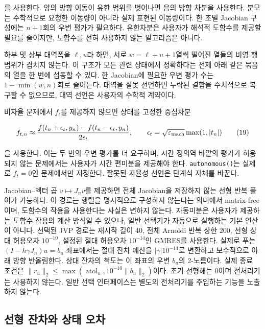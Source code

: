\documentclass[
  10pt,
  dvipsnames]{article}
\begin{document}
를 사용한다. 양의 방향 이동이 유한 범위를 벗어나면 음의 방향 차분을
사용한다. 분모는 수학적으로 요청한 이동량이 아니라 실제 표현된
이동량이다. 한 조밀 Jacobian 구성에는 \(n+1\)회의 우변 평가가 필요하다.
유한차분은 사용자가 해석적 도함수를 제공할 필요를 줄이지만, 도함수를
전혀 사용하지 않는 알고리즘은 아니다.

하부 및 상부 대역폭을 \(\ell,u\)라 하면, 서로 \(w=\ell+u+1\)열씩 떨어진
열들의 비영 행 범위가 겹치지 않는다. 이 구조가 모든 관련 상태에서
정확하다는 전제 아래 같은 묶음의 열을 한 번에 섭동할 수 있다. 한
Jacobian에 필요한 우변 평가 수는 \(1+\min(w,n)\)회로 줄어든다. 대역을
잘못 선언하면 누락된 결합을 수치적으로 복구할 수 없으므로, 대역 선언은
사용자의 수학적 계약이다.

비자율 문제에서 \(f_t\)를 제공하지 않으면 상태를 고정한 중심차분

\[
 f_{t,n}\approx\frac{f(t_n+\epsilon_t,y_n)-f(t_n-\epsilon_t,y_n)}{2\epsilon_t},
 \qquad \epsilon_t=\sqrt{\varepsilon_{\rm mach}}\max(1,|t_n|)
 \tag{19}
\]

을 사용한다. 이는 두 번의 우변 평가를 더 요구하며, 시간 정의역 바깥의
평가가 허용되지 않는 문제에서는 사용자가 시간 편미분을 제공해야 한다.
\texttt{autonomous()}는 실제로 \(f_t=0\)인 문제에서만 지정한다. 잘못된
자율성 선언은 단계식 자체를 바꾼다.

Jacobian--벡터 곱 \(v\mapsto J_nv\)를 제공하면 전체 Jacobian을 저장하지
않는 선형 반복 풀이가 가능하다. 이 경로는 행렬을 명시적으로 구성하지
않는다는 의미에서 matrix-free이며, 도함수의 작용을 사용한다는 사실은
변하지 않는다. 자동미분은 사용자가 제공하는 도함수 작용의 계산 방식일 수
있으나, 일반 선택기가 자동으로 실행하는 기본 연산이 아니다. 선택된 JVP
경로는 재시작 길이 40, 전체 Arnoldi 반복 상한 200, 선형 상대 허용오차
\(10^{-10}\), 설정된 절대 허용오차 \(10^{-14}\)인 GMRES를 사용한다.
실제로 푸는 \((I-h\gamma J_n)u=b_u\) 좌표에서는 절대 잔차 예산을
\(|\gamma|10^{-14}\)로 변환하고 보수적으로 아래 방향 반올림한다. 상대
잔차의 척도는 이 좌표의 우변 \(b_u\)의 2-노름이다. 실제 종료 조건은
\(\|r_u\|_2\le\max(\operatorname{atol}_u,10^{-10}\|b_u\|_2)\)이다. 초기
선형해는 0이며 전처리기는 사용하지 않는다. 일반 선택 인터페이스는 별도의
전처리기를 주입하는 기능을 노출하지 않는다.

\hypertarget{uxc120uxd615-uxc794uxcc28uxc640-uxc0c1uxd0dc-uxc624uxcc28}{%
\subsection{선형 잔차와 상태
오차}\label{uxc120uxd615-uxc794uxcc28uxc640-uxc0c1uxd0dc-uxc624uxcc28}}
\end{document}

